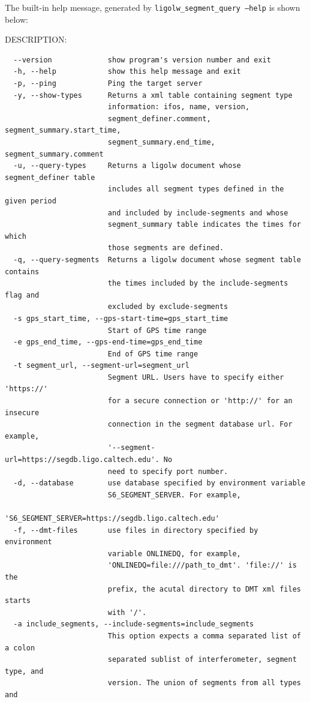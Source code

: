 The built-in help message, generated by \texttt{ligolw\_segment\_query
--help} is shown below:

DESCRIPTION:
{\small
\begin{verbatim}
  --version             show program's version number and exit
  -h, --help            show this help message and exit
  -p, --ping            Ping the target server
  -y, --show-types      Returns a xml table containing segment type
                        information: ifos, name, version,
                        segment_definer.comment, segment_summary.start_time,
                        segment_summary.end_time, segment_summary.comment
  -u, --query-types     Returns a ligolw document whose segment_definer table
                        includes all segment types defined in the given period
                        and included by include-segments and whose
                        segment_summary table indicates the times for which
                        those segments are defined.
  -q, --query-segments  Returns a ligolw document whose segment table contains
                        the times included by the include-segments flag and
                        excluded by exclude-segments
  -s gps_start_time, --gps-start-time=gps_start_time
                        Start of GPS time range
  -e gps_end_time, --gps-end-time=gps_end_time
                        End of GPS time range
  -t segment_url, --segment-url=segment_url
                        Segment URL. Users have to specify either 'https://'
                        for a secure connection or 'http://' for an insecure
                        connection in the segment database url. For example,
                        '--segment-url=https://segdb.ligo.caltech.edu'. No
                        need to specify port number.
  -d, --database        use database specified by environment variable
                        S6_SEGMENT_SERVER. For example,
                        'S6_SEGMENT_SERVER=https://segdb.ligo.caltech.edu'
  -f, --dmt-files       use files in directory specified by environment
                        variable ONLINEDQ, for example,
                        'ONLINEDQ=file:///path_to_dmt'. 'file://' is the
                        prefix, the acutal directory to DMT xml files starts
                        with '/'.
  -a include_segments, --include-segments=include_segments
                        This option expects a comma separated list of a colon
                        separated sublist of interferometer, segment type, and
                        version. The union of segments from all types and

\end{verbatim}}
